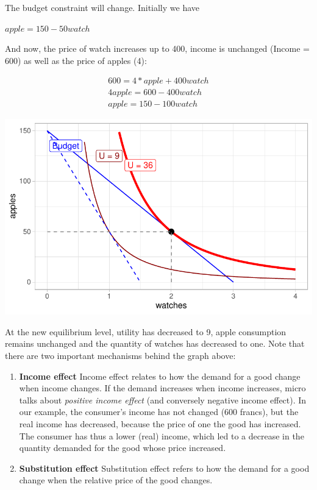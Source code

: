 \documentclass[
  letterpaper,
  DIV=11,
  numbers=noendperiod]{scrreprt}
\begin{document}
The budget constraint will change. Initially we have

\(apple = 150 - 50watch\)

And now, the price of watch increases up to 400, income is unchanged
(Income = 600) as well as the price of apples (4):

\[
\begin{aligned}
600 = 4*apple + 400watch
\\
4apple = 600-400watch
\\
apple = 150 - 100watch
\end{aligned}
\]

\includegraphics{consumer-theory_files/figure-pdf/unnamed-chunk-16-1.pdf}

At the new equilibrium level, utility has decreased to 9, apple
consumption remains unchanged and the quantity of watches has decreased
to one. Note that there are two important mechanisms behind the graph
above:

\begin{enumerate}
\def\labelenumi{\arabic{enumi}.}
\item
  \textbf{Income effect} Income effect relates to how the demand for a
  good change when income changes. If the demand increases when income
  increases, micro talks about \emph{positive income effect} (and
  conversely negative income effect). In our example, the consumer's
  income has not changed (600 francs), but the real income has
  decreased, because the price of one the good has increased. The
  consumer has thus a lower (real) income, which led to a decrease in
  the quantity demanded for the good whose price increased.
\item
  \textbf{Substitution effect} Substitution effect refers to how the
  demand for a good change when the relative price of the good changes.
\end{enumerate}
\end{document}
